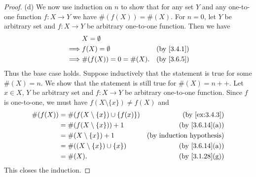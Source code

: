 \begin{proof}{(d)}
  We now use induction on \(n\) to show that for any set \(Y\) and any one-to-one function \(f : X \to Y\) we have \(\#(f(X)) = \#(X)\).
  For \(n = 0\), let \(Y\) be arbitrary set and \(f : X \to Y\) be arbitrary one-to-one function.
  Then we have
  \begin{align*}
             & X = \emptyset                                    \\
    \implies & f(X) = \emptyset      & \text{(by \cref{3.4.1})} \\
    \implies & \#(f(X)) = 0 = \#(X). & \text{(by \cref{3.6.5})}
  \end{align*}
  Thus the base case holds.
  Suppose inductively that the statement is true for some \(\#(X) = n\).
  We show that the statement is still true for \(\#(X) = n++\).
  Let \(x \in X\), \(Y\) be arbitrary set and \(f : X \to Y\) be arbitrary one-to-one function.
  Since \(f\) is one-to-one, we must have \(f(X \setminus \{x\}) \neq f(X)\) and
  \begin{align*}
    \#(f(X)) & = \#(f(X \setminus \{x\}) \cup \{f(x)\}) & \text{(by \cref{ex:3.4.3})}      \\
             & = \#(f(X \setminus \{x\})) + 1           & \text{(by \cref{3.6.14}(a))}     \\
             & = \#(X \setminus \{x\}) + 1              & \text{(by induction hypothesis)} \\
             & = \#((X \setminus \{x\}) \cup \{x\})     & \text{(by \cref{3.6.14}(a))}     \\
             & = \#(X).                                 & \text{(by \cref{3.1.28}(g))}
  \end{align*}
  This closes the induction.
\end{proof}

